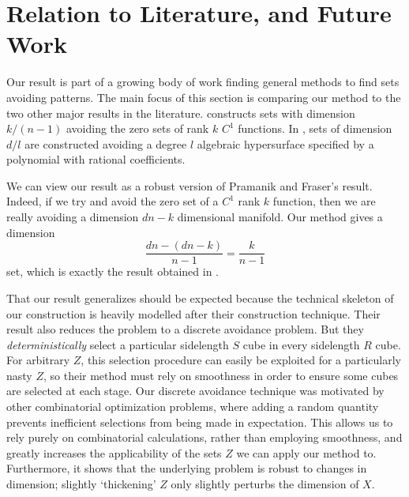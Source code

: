\documentclass[usenames,dvipsnames]{article}
\theoremstyle{plain}
\theoremstyle{plain}
\begin{document}

\section{Relation to Literature, and Future Work}

Our result is part of a growing body of work finding general methods to find sets avoiding patterns. The main focus of this section is comparing our method to the two other major results in the literature. \cite{MalabikaRob} constructs sets with dimension $k/(n-1)$ avoiding the zero sets of rank $k$ $C^1$ functions. In \cite{Mathe}, sets of dimension $d/l$ are constructed avoiding a degree $l$ algebraic hypersurface specified by a polynomial with rational coefficients.

We can view our result as a robust version of Pramanik and Fraser's result. Indeed, if we try and avoid the zero set of a $C^1$ rank $k$ function, then we are really avoiding a dimension $dn - k$ dimensional manifold. Our method gives a dimension
%
\[ \frac{dn - (dn - k)}{n - 1} = \frac{k}{n - 1} \]
%
set, which is exactly the result obtained in \cite{MalabikaRob}.

That our result generalizes \cite{MalabikaRob} should be expected because the technical skeleton of our construction is heavily modelled after their construction technique. Their result also reduces the problem to a discrete avoidance problem. But they {\it deterministically} select a particular sidelength $S$ cube in every sidelength $R$ cube. For arbitrary $Z$, this selection procedure can easily be exploited for a particularly nasty $Z$, so their method must rely on smoothness in order to ensure some cubes are selected at each stage. Our discrete avoidance technique was motivated by other combinatorial optimization problems, where adding a random quantity prevents inefficient selections from being made in expectation. This allows us to rely purely on combinatorial calculations, rather than employing smoothness, and greatly increases the applicability of the sets $Z$ we can apply our method to. Furthermore, it shows that the underlying problem is robust to changes in dimension; slightly `thickening' $Z$ only slightly perturbs the dimension of $X$.
\end{document}
